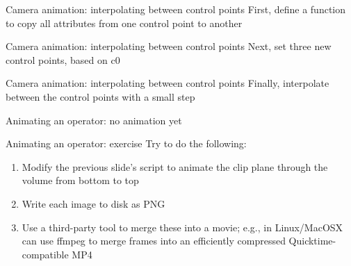 \begin{frame}{Camera animation: interpolating between control points}
  First, define a function to copy all attributes from one control point to another
  
\end{frame}

\begin{frame}{Camera animation: interpolating between control points}
  Next, set three new control points, based on c0
  
\end{frame}

\begin{frame}{Camera animation: interpolating between control points}
  Finally, interpolate between the control points with a small step
  
\end{frame}

\begin{frame}{Animating an operator: no animation yet}
  
\end{frame}


\begin{frame}{Animating an operator: exercise}
  \qquad Try to do the following:\bigskip
  \begin{enumerate}\setlength{\itemsep}{3mm}
  \item Modify the previous slide's script to animate the clip plane through the volume from bottom to
    top
  \item Write each image to disk as PNG
  \item Use a third-party tool to merge these into a movie;
    e.g., in Linux/MacOSX can use ffmpeg to merge frames into an efficiently compressed
    Quicktime-compatible MP4\ffmpeg
  \end{enumerate}
\end{frame}

